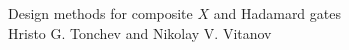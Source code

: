\documentclass[10pt]{article}
\begin{document}
\begin{center}
{\Large Design methods for composite $X$ and Hadamard gates}\\[4pt]
Hristo G. Tonchev and Nikolay V. Vitanov
\end{center}

\end{document}

